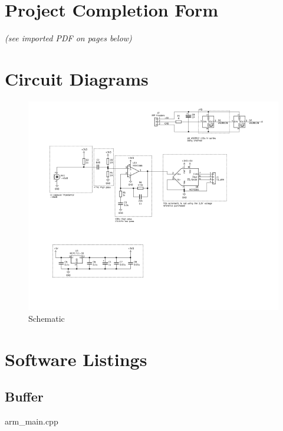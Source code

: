 \documentclass[a4paper]{article}
\begin{document}
\section{Project Completion Form}
\textit{(see imported PDF on pages below)}


\section{Circuit Diagrams}

\begin{figure}[H]
\begin{center}
\includegraphics[width=500pt]{appendixC/schematic-cropped.png}
\caption{Schematic}
\label{fig:schem}
\end{center}
\end{figure}

\section{Software Listings}

\subsection{Buffer}
arm\_main.cpp

\end{document}
